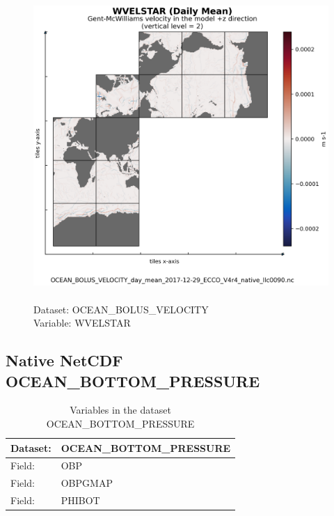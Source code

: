 \begin{figure}[H]
\centering
\includegraphics[scale=0.5]{../images/plots/native_plots/Gent-McWilliams_Ocean_Bolus_Velocity/WVELSTAR.png}
\caption{\\Dataset: OCEAN\_BOLUS\_VELOCITY\\Variable: WVELSTAR}
\label{tab:table-OCEAN_BOLUS_VELOCITY_WVELSTAR-Plot}
\end{figure}
\pagebreak
\subsection{Native NetCDF OCEAN\_BOTTOM\_PRESSURE}
\newp
\begin{longtable}{|p{}|p{}|}
\caption{Variables in the dataset OCEAN\_BOTTOM\_PRESSURE}
\label{tab:table-OCEAN_BOTTOM_PRESSURE-fields} \\ 
\hline \endhead \hline \endfoot
\rowcolor{lightgray} \textbf{Dataset:} & \textbf{OCEAN\_BOTTOM\_PRESSURE} \\ \hline
Field: &OBP \\ \hline
Field: &OBPGMAP \\ \hline
Field: &PHIBOT \\ \hline
\end{longtable}

\pagebreak

